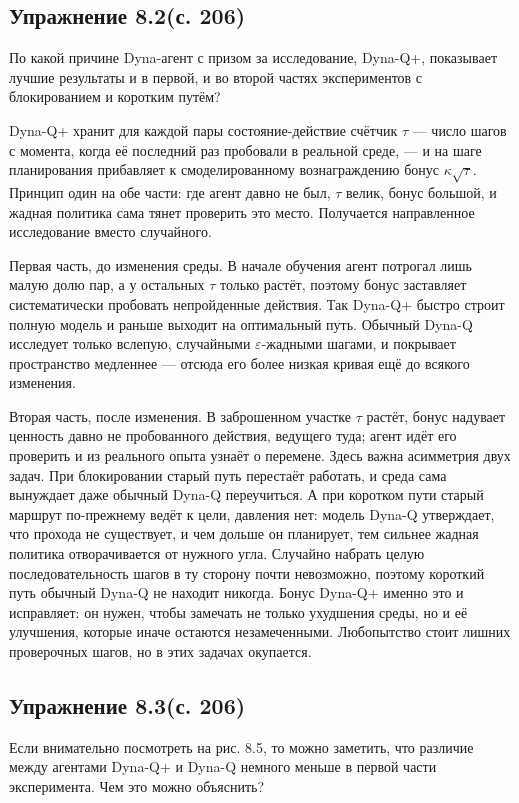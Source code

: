\subsection{Упражнение 8.2(с. 206)}
По какой причине Dyna-агент с призом за исследование, Dyna-Q+, показывает
лучшие результаты и в первой, и во второй частях экспериментов с блокированием и коротким путём?

\begin{solution}
    Dyna-Q+ хранит для каждой пары состояние-действие счётчик $\tau$ --- число
    шагов с момента, когда её последний раз пробовали в реальной среде, --- и на
    шаге планирования прибавляет к смоделированному вознаграждению бонус
    $\kappa\sqrt{\tau}$. Принцип один на обе части: где агент давно не был,
    $\tau$ велик, бонус большой, и жадная политика сама тянет проверить это
    место. Получается направленное исследование вместо случайного.

    Первая часть, до изменения среды. В начале обучения агент потрогал лишь
    малую долю пар, а у остальных $\tau$ только растёт, поэтому бонус заставляет
    систематически пробовать непройденные действия. Так Dyna-Q+ быстро строит
    полную модель и раньше выходит на оптимальный путь. Обычный Dyna-Q
    исследует только вслепую, случайными $\varepsilon$-жадными шагами, и
    покрывает пространство медленнее --- отсюда его более низкая кривая ещё до
    всякого изменения.

    Вторая часть, после изменения. В заброшенном участке $\tau$ растёт, бонус
    надувает ценность давно не пробованного действия, ведущего туда; агент идёт
    его проверить и из реального опыта узнаёт о перемене. Здесь важна асимметрия
    двух задач. При блокировании старый путь перестаёт работать, и среда сама
    вынуждает даже обычный Dyna-Q переучиться. А при коротком пути старый
    маршрут по-прежнему ведёт к цели, давления нет: модель Dyna-Q утверждает,
    что прохода не существует, и чем дольше он планирует, тем сильнее жадная
    политика отворачивается от нужного угла. Случайно набрать целую
    последовательность шагов в ту сторону почти невозможно, поэтому короткий
    путь обычный Dyna-Q не находит никогда. Бонус Dyna-Q+ именно это и
    исправляет: он нужен, чтобы замечать не только ухудшения среды, но и её
    улучшения, которые иначе остаются незамеченными. Любопытство стоит лишних
    проверочных шагов, но в этих задачах окупается.
\end{solution}

\subsection{Упражнение 8.3(с. 206)}
Если внимательно посмотреть на рис. 8.5, то можно заметить, что различие между
агентами Dyna-Q+ и Dyna-Q немного меньше в первой части эксперимента. Чем это
можно объяснить?

